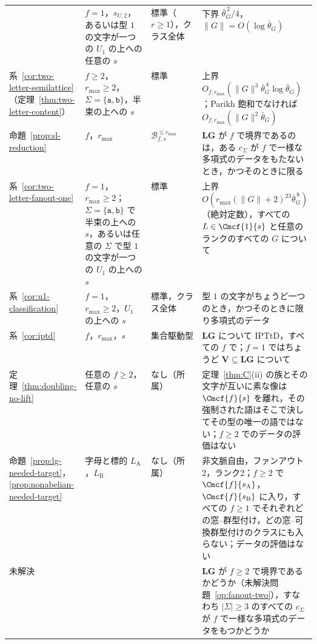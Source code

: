 \begin{table}[htbp]
\begin{tabularx}{\linewidth}{@{}>{\raggedright\arraybackslash}p{0.2\linewidth}>{\raggedright\arraybackslash}p{0.22\linewidth}>{\raggedright\arraybackslash}p{0.17\linewidth}>{\raggedright\arraybackslash}X@{}}
 & $f=1$，$s_{U,2}$，あるいは型 $1$ の文字が一つの $U_1$ の上への任意の $s$
 & 標準（$r\ge1$），クラス全体
 & 下界 $\bar\theta_G^{\,2}/4$，$\|G\|=O(\log\bar\theta_G)$\\
系~\ref{cor:two-letter-semilattice}（定理~\ref{thm:two-letter-content}）
 & $f\ge2$，$r_{\max}\ge2$，$\Sigma=\{\mathtt a,\mathtt b\}$，半束の上への $s$
 & 標準
 & 上界 $O_{f,r_{\max}}(\|G\|^3\bar\theta_G^{\,4}\log\bar\theta_G)$；Parikh 飽和でなければ $O_{f,r_{\max}}(\|G\|^2\bar\theta_G)$\\
命題~\ref{prop:sl-reduction}
 & $f$，$r_{\max}$
 & $\mathcal B^{\le r_{\max}}_{f,s}$
 & $\mathbf{LG}$ が $f$ で境界であるのは，ある $c_\Sigma$ が $f$ で一様な多項式のデータをもたないとき，かつそのときに限る\\
系~\ref{cor:two-letter-fanout-one}
 & $f=1$，$r_{\max}\ge2$；$\Sigma=\{\mathtt a,\mathtt b\}$ で半束の上への $s$，あるいは任意の $\Sigma$ で型 $1$ の文字が一つの $U_1$ の上への $s$
 & 標準
 & 上界 $O(r_{\max}(\|G\|+2)^{23}\bar\theta_G^{\,8})$（絶対定数），すべての $L\in\Cmcf{1}{s}$ と任意のランクのすべての $G$ について\\
系~\ref{cor:u1-classification}
 & $f=1$，$r_{\max}\ge2$，$U_1$ の上への $s$
 & 標準，クラス全体
 & 型 $1$ の文字がちょうど一つのとき，かつそのときに限り多項式のデータ\\
系~\ref{cor:iptd}
 & $f$，$r_{\max}$，$s$
 & 集合駆動型
 & $\mathbf{LG}$ について IPTtD，すべての $f$ で；$f=1$ ではちょうど $\mathbf{V}\subseteq\mathbf{LG}$ について\\
定理~\ref{thm:doubling-no-lift}
 & 任意の $f\ge2$，任意の $s$
 & なし（所属）
  & 定理~\ref{thm:C}(ii) の族とその文字が互いに素な像は $\Cmcf{f}{s}$ を離れ，その強制された語はそこで決してその型の唯一の語ではない；$f\ge2$ でのデータの評価はない\\
命題~\ref{prop:lg-needed-target}，\ref{prop:nonabelian-needed-target}
 & 字母と標的 $L_{\mathrm A}$，$L_{\mathrm B}$
 & なし（所属）
 & 非文脈自由，ファンアウト2，ランク2；$f\ge2$ で $\Cmcf{f}{s_{\mathrm A}}$，$\Cmcf{f}{s_{\mathrm B}}$ に入り，すべての $f\ge1$ でそれぞれどの窓--群型付け，どの窓--可換群型付けのクラスにも入らない；データの評価はない\\
未解決
 & 
 & 
 & $\mathbf{LG}$ が $f\ge2$ で境界であるかどうか（未解決問題~\ref{op:fanout-two}），すなわち $|\Sigma|\ge3$ のすべての $c_\Sigma$ が $f$ で一様な多項式のデータをもつかどうか\\
\hline
\end{tabularx}
\end{table}

